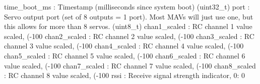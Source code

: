 \begin{DoxyVerb}
\begin{DoxyVerb}
\begin{DoxyVerb}
\begin{DoxyVerb}
\begin{DoxyVerb}
\begin{DoxyVerb}
\begin{DoxyVerb}
\begin{DoxyVerb}
time_boot_ms              : Timestamp (milliseconds since system boot) (uint32_t)
port                      : Servo output port (set of 8 outputs = 1 port). Most MAVs will just use one, but this allows for more than 8 servos. (uint8_t)
chan1_scaled              : RC channel 1 value scaled, (-100%
chan2_scaled              : RC channel 2 value scaled, (-100%
chan3_scaled              : RC channel 3 value scaled, (-100%
chan4_scaled              : RC channel 4 value scaled, (-100%
chan5_scaled              : RC channel 5 value scaled, (-100%
chan6_scaled              : RC channel 6 value scaled, (-100%
chan7_scaled              : RC channel 7 value scaled, (-100%
chan8_scaled              : RC channel 8 value scaled, (-100%
rssi                      : Receive signal strength indicator, 0: 0%
 \mbox{\label{classpymavlink_1_1dialects_1_1v10_1_1MAVLink_a1fe588ae0be694b1aaf7b91cff278fce}} 

\end{DoxyVerb}
\end{DoxyVerb}
\end{DoxyVerb}
\end{DoxyVerb}
\end{DoxyVerb}
\end{DoxyVerb}
\end{DoxyVerb}
\end{DoxyVerb}
